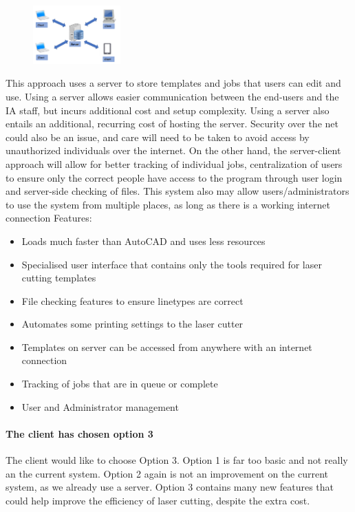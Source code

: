 \documentclass[oneside,openany,11pt,a4paper]{report}
\begin{document}
\begin{figure} \centering \includegraphics[width=0.3\textwidth]{sol3.png} \end{figure} 
This approach uses a server to store templates and jobs that users can edit and use. Using a server allows easier communication between the end-users and the IA staff, but incurs additional cost and setup complexity. Using a server also entails an additional, recurring cost of hosting the server. Security over the net could also be an issue, and care will need to be taken to avoid access by unauthorized individuals over the internet. On the other hand, the server-client approach will allow for better tracking of individual jobs, centralization of users to ensure only the correct people have access to the program through user login and server-side checking of files. This system also may allow users/administrators to use the system from multiple places, as long as there is a working internet connection
Features:
	\begin{itemize}
	\itemsep0em
	\item Loads much faster than AutoCAD and uses less resources
    \item Specialised user interface that contains only the tools required for laser cutting templates
    \item File checking features to ensure linetypes are correct
    \item Automates some printing settings to the laser cutter
    \item Templates on server can be accessed from anywhere with an internet connection
    \item Tracking of jobs that are in queue or complete
    \item User and Administrator management
    \end{itemize}


\paragraph{The client has chosen option 3}
The client would like to choose Option 3. Option 1 is far too basic and not really an  the current system. Option 2 again is not an improvement on the current system, as we already use a server. Option 3 contains many new features that could help improve the efficiency of laser cutting, despite the extra cost.
\end{document}
